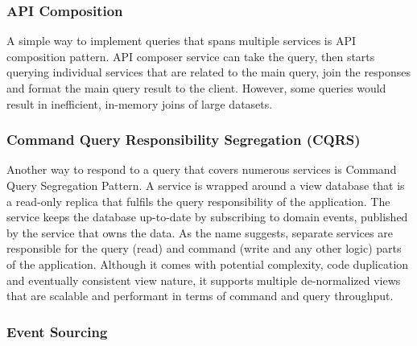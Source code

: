 \documentclass{Configuration_Files/PoliMi3i_thesis}
\begin{document}
\subsubsection{API Composition}
\label{subsubsec:api_comp}

A simple way to implement queries that spans multiple services is API composition pattern.
API composer service can take the query, then starts querying individual services that are related to the main query, join the responses and format the main query result to the client.
However, some queries would result in inefficient, in-memory joins of large datasets.

\subsubsection{Command Query Responsibility Segregation (CQRS)}
\label{subsubsec:cqrs}

Another way to respond to a query that covers numerous services is Command Query Segregation Pattern.
A service is wrapped around a view database that is a read-only replica that fulfils the query responsibility of the application.
The service keeps the database up-to-date by subscribing to domain events, published by the service that owns the data.
As the name suggests, separate services are responsible for the query (read) and command (write and any other logic) parts of the application.
Although it comes with potential complexity, code duplication and eventually consistent view nature, it supports multiple de-normalized views that are scalable and performant in terms of command and query throughput.

\subsubsection{Event Sourcing}
\label{subsubsec:event_sourcing}
\end{document}
